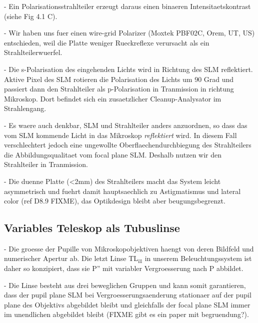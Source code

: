   - Ein Polarisationsstrahlteiler erzeugt daraus einen binaeren
    Intensitaetskontrast (siehe Fig 4.1 C).

  - Wir haben uns fuer einen wire-grid Polarizer (Moxtek PBF02C, Orem,
    UT, US) entschieden, weil die Platte weniger Rueckreflexe
    verursacht als ein Strahlteilerwuerfel.

  - Die s-Polarisation des eingehenden Lichts wird in Richtung des SLM
    reflektiert. Aktive Pixel des SLM rotieren die Polarisation des
    Lichts um 90 Grad und passiert dann den Strahlteiler als
    p-Polarisation in Tranmission in richtung Mikroskop. Dort befindet
    sich ein zusaetzlicher Cleanup-Analysator im Strahlengang.
 
  - Es waere auch denkbar, SLM und Strahlteiler anders anzuordnen, so
    dass das vom SLM kommende Licht in das Mikroskop
    \emph{reflektiert} wird. In diesem Fall verschlechtert jedoch eine
    ungewollte Oberflaechendurchbiegung des Strahlteilers die
    Abbildungsqualitaet vom focal plane SLM. Deshalb nutzen wir den
    Strahlteiler in Tranmission.

  - Die duenne Platte (<2mm) des Strahlteilers macht das System leicht
    asymmetrisch und fuehrt damit hauptsaechlich zu Astigmatismus und
    lateral color (ref D8.9 FIXME), das Optikdesign bleibt aber
    beugungsbegrenzt.





\subsection{ Variables Teleskop als Tubuslinse}
  - Die groesse der Pupille von Mikroskopobjektiven haengt von deren
    Bildfeld und numerischer Apertur ab. Die letzt Linse
    TL${}_\textrm{ill}$ in unserem Beleuchtungssystem ist daher so
    konzipiert, dass sie P'' mit variabler Vergroesserung nach P
    abbildet. 

  - Die Linse besteht aus drei beweglichen Gruppen und kann somit
    garantieren, dass der pupil plane SLM bei Vergroesserungsaenderung
    stationaer auf der pupil plane des Objektivs abgebildet bleibt und
    gleichfalls der focal plane SLM immer im unendlichen abgebildet
    bleibt (FIXME gibt es ein paper mit begruendung?).





